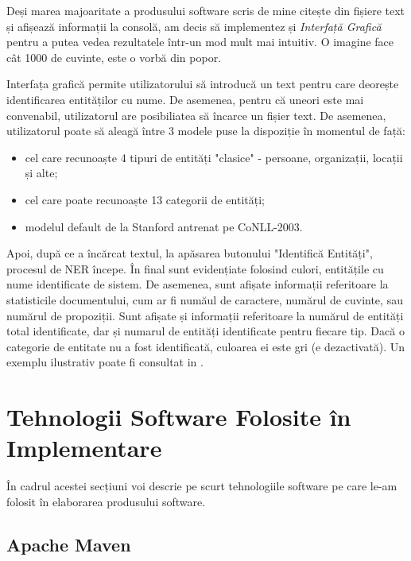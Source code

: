 Deși marea majoaritate a produsului software scris de mine citește din fișiere text și afișează informații la consolă, am decis să implementez și \textit{Interfață Grafică} pentru a putea vedea rezultatele într-un mod mult mai intuitiv. O imagine face cât 1000 
de cuvinte, este o vorbă din popor.

Interfața grafică permite utilizatorului să introducă un text pentru care deorește identificarea entităților cu nume. De asemenea, pentru că uneori este mai convenabil, utilizatorul are posibiliatea să încarce un fișier text. De asemenea, utilizatorul poate să aleagă între 3 modele puse la dispoziție în momentul de față:
\begin{itemize}
\item  cel care recunoaște 4 tipuri de entități "clasice" - persoane, organizații, locații și alte;
\item cel care poate recunoaște 13 categorii de entități;
\item modelul default de la Stanford antrenat pe CoNLL-2003.
\end{itemize}

Apoi, după ce a încărcat textul, la apăsarea butonului "Identifică Entități", procesul de NER începe. În final sunt evidențiate folosind culori, entitățile cu nume identificate de sistem. De asemenea, sunt afișate informații referitoare la statisticile documentului, cum ar fi număul de caractere, numărul de cuvinte, sau numărul de propoziții. Sunt afișate și informații referitoare la numărul de entități total identificate, dar și numarul de entități identificate pentru fiecare tip. Dacă o categorie de entitate nu a fost identificată, culoarea ei este gri (e dezactivată). Un exemplu ilustrativ poate fi consultat in .


\section{Tehnologii Software Folosite în Implementare}

În cadrul acestei secțiuni voi descrie pe scurt tehnologiile software pe care le-am folosit în elaborarea produsului software.

\subsection{Apache Maven}

